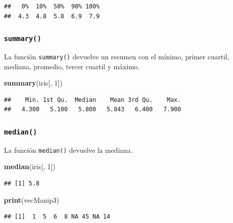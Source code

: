 \documentclass[
]{book}
\newenvironment{Shaded}{\begin{snugshade}}{\end{snugshade}}
\newcommand{\DecValTok}[1]{\textcolor[rgb]{0.00,0.00,0.81}{#1}}
\newcommand{\KeywordTok}[1]{\textcolor[rgb]{0.13,0.29,0.53}{\textbf{#1}}}
\newcommand{\NormalTok}[1]{#1}
\begin{document}
\begin{verbatim}
##   0%  10%  50%  90% 100% 
##  4.3  4.8  5.8  6.9  7.9
\end{verbatim}

\hypertarget{l015summary}{%
\subsubsection{\texorpdfstring{\texttt{summary()}}{summary()}}\label{l015summary}}

La función \texttt{summary()} devuelve un resumen con el mínimo, primer cuartil, mediana, promedio, tercer cuartil y máximo.

\begin{Shaded}
\begin{Highlighting}[]
\KeywordTok{summary}\NormalTok{(iris[, }\DecValTok{1}\NormalTok{])}
\end{Highlighting}
\end{Shaded}

\begin{verbatim}
##    Min. 1st Qu.  Median    Mean 3rd Qu.    Max. 
##   4.300   5.100   5.800   5.843   6.400   7.900
\end{verbatim}

\hypertarget{l015median}{%
\subsubsection{\texorpdfstring{\texttt{median()}}{median()}}\label{l015median}}

La función \texttt{median()} devuelve la mediana.

\begin{Shaded}
\begin{Highlighting}[]
\KeywordTok{median}\NormalTok{(iris[, }\DecValTok{1}\NormalTok{])}
\end{Highlighting}
\end{Shaded}

\begin{verbatim}
## [1] 5.8
\end{verbatim}

\begin{Shaded}
\begin{Highlighting}[]
\KeywordTok{print}\NormalTok{(vecManip3)}
\end{Highlighting}
\end{Shaded}

\begin{verbatim}
## [1]  1  5  6  8 NA 45 NA 14
\end{verbatim}
\end{document}
